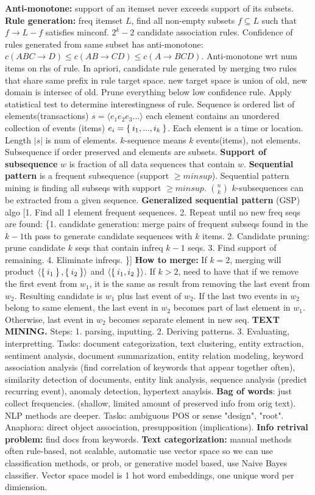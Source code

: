 \documentclass{amsbook}
\theoremstyle{plain}
\theoremstyle{definition}
\theoremstyle{remark}
\newcommand{\sub}{\subseteq}
\begin{document}
\textbf{Anti-monotone:} support of an itemset never exceeds support of its subsets. \textbf{Rule generation: } freq itemset $L$, find all non-empty subsets $f \sub L$ such that $f \to L - f$ satisfies minconf. $2^k - 2$ candidate association rules. Confidence of rules generated from same subset has anti-monotone: $c(ABC \to D) \leq c(AB \to CD) \leq c(A \to BCD)$. Anti-monotone wrt num items on rhs of rule. In apriori, candidate rule generated by merging two rules that share same prefix in rule target space. new target space is union of old, new domain is intersec of old. Prune everything below low confidence rule. Apply statistical test to determine interestingness of rule. Sequence is ordered list of elements(transactions) $s = \langle e_1e_2e_3...\rangle$ each element contains an unordered collection of events (items) $e_i = \Set{i_1,...,i_k}$. Each element is a time or location. Length $|s|$ is num of elements. $k$-sequence means $k$ events(items), not elements. Subsequence if order preserved and elements are subsets. \textbf{Support of subsequence} $w$ is fraction of all data sequences that contain $w$. \textbf{Sequential pattern} is a frequent subsequence (support $\geq minsup$). Sequential pattern mining is finding all subseqs with support $\geq minsup$. $\binom{n}{k}$ $k$-subsequences can be extracted from a given sequence. \textbf{Generalized sequential pattern} (GSP) algo [1. Find all 1 element frequent sequences. 2. Repeat until no new freq seqs are found: \{1. candidate generation: merge pairs of frequent subseqs found in the $k - 1$th pass to generate candidate sequences with $k$ items.  2. Candidate pruning: prune candidate $k$ seqs that contain infreq $k - 1$ seqs. 3. Find support of remaining. 4. Eliminate infreqs. \}] \textbf{How to merge: } If $k = 2$, merging will product $\langle \Set{i_1},\Set{i_2}\rangle$ and $\langle \Set{i_1,i_2}\rangle$. If $k > 2$, need to have that if we remove the first event from $w_1$, it is the same as result from removing the last event from $w_2$. Resulting candidate is $w_1$ plus last event of $w_2$. If the last two events in $w_2$ belong to same element, the last event in $w_2$ becomes part of last element in $w_1$. Otherwise, last event in $w_2$ becomes separate element in new seq. \textbf{TEXT MINING. } Steps: 1. parsing, inputting. 2. Deriving patterns. 3. Evaluating, interpretting. Tasks: document categorization, text clustering, entity extraction, sentiment analysis, document summarization, entity relation modeling, keyword association analysis (find correlation of keywords that appear together often), similarity detection of documents, entity link analysis, sequence analysis (predict recurring event), anomaly detection, hypertext anaylsis. \textbf{Bag of words}: just collect frequencies. (shallow, limited amount of preserved info from orig text). NLP methods are deeper. Tasks: ambiguous POS or sense "design", "root". Anaphora: direct object association, presupposition (implications). \textbf{Info retrival problem: } find docs from keywords. \textbf{Text categorization:} manual methods often rule-based, not scalable, automatic use vector space so we can use classification methods, or prob, or generative model based, use Naive Bayes classifier. Vector space model is 1 hot word embeddings, one unique word per dimiension. 
\end{document}
